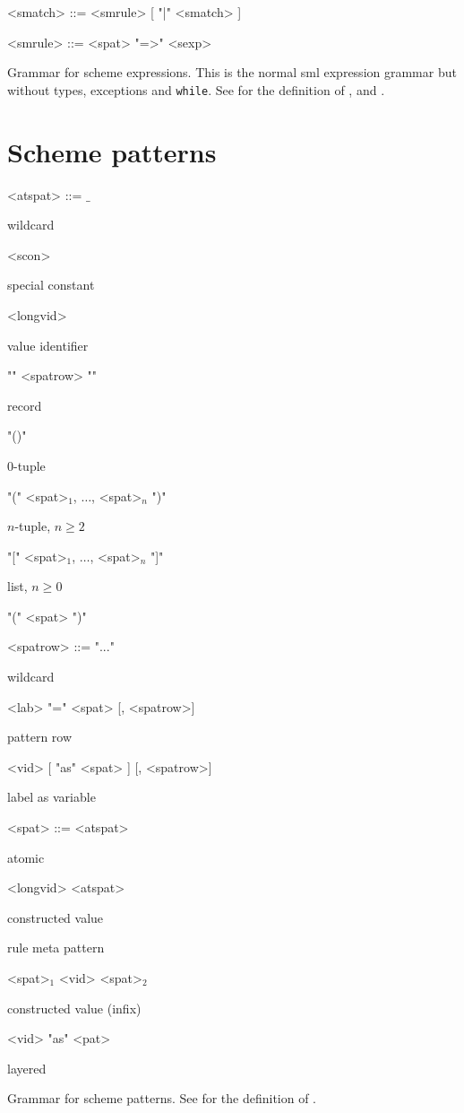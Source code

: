 \begin{nonfloatingtable}
\begin{grammar}
  <smatch> ::= <smrule> [ "|" <smatch> ]
  
  <smrule> ::= <spat> "=>" <sexp>
\end{grammar}

  \caption{Grammar for scheme expressions. This is the normal sml expression
    grammar but without types, exceptions and \texttt{while}.  See  for
    the definition of ,  and .}
  \label{tab:scheme-expressions}
\end{nonfloatingtable}

\clearpage

\section{Scheme patterns}

\begin{nonfloatingtable}

\setlength{\grammarindent}{7em}


\renewcommand{\cmt}[1]{\parbox{8em}{\small{#1}}}

\begin{grammar}
  <atspat> ::= $\_$                              \hfill \cmt{wildcard}
  \alt <scon>                                    \hfill \cmt{special constant}
  \alt ["op"] <longvid>                          \hfill \cmt{value identifier}
  \alt "{" <spatrow> "}"                         \hfill \cmt{record}
  \alt "()"                                      \hfill \cmt{$0$-tuple}
  \alt "(" <spat>$_1$, $\ldots$, <spat>$_n$ ")"  \hfill \cmt{$n$-tuple, $n \geq  2$}
  \alt "[" <spat>$_1$, $\ldots$, <spat>$_n$ "]"  \hfill \cmt{list, $n \geq 0$}
  \alt "(" <spat> ")" 

  <spatrow> ::= "..."                      \hfill \cmt{wildcard}
  \alt <lab> "=" <spat> [, <spatrow>]      \hfill \cmt{pattern row}
  \alt <vid> [ "as" <spat> ] [, <spatrow>] \hfill \cmt{label as variable}

  <spat> ::= <atspat>                      \hfill \cmt{atomic}
  \alt ["op"] <longvid> <atspat>           \hfill \cmt{constructed value}
                   \hfill \cmt{rule meta pattern}
  \alt <spat>$_1$ <vid> <spat>$_2$         \hfill \cmt{constructed value (infix)}
  \alt ["op"] <vid> "as" <pat>             \hfill \cmt{layered}
\end{grammar}
  
  \caption{Grammar for scheme patterns. See  for
    the definition of .}
  \label{tab:scheme-patterns}
\end{nonfloatingtable}

